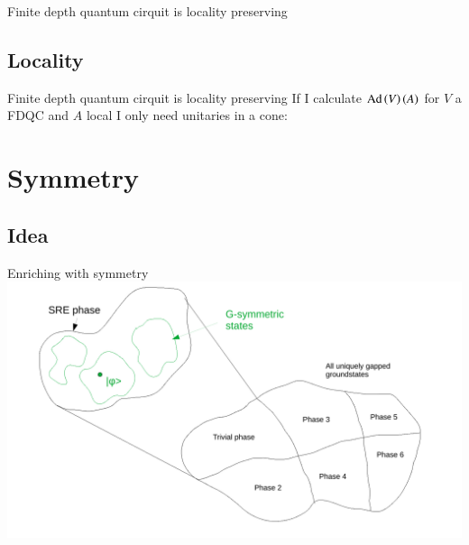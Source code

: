 \documentclass{beamer}
\begin{document}
\begin{frame}{Finite depth quantum cirquit is locality preserving}
	\begin{center}
		\scalebox{0.75}{}
	\end{center}
	\pause
	\begin{center}
		\scalebox{0.75}{}
	\end{center}
\end{frame}

\subsection{Locality}

\begin{frame}{Finite depth quantum cirquit is locality preserving}
	If I calculate $\textrm{Ad}\left(V\right)(A)$ for $V$ a FDQC and $A$ local I only need unitaries in a cone:
	\begin{center}
		\scalebox{0.75}{
			
		}
	\end{center}
\end{frame}

\section{Symmetry}
\subsection{Idea}

\begin{frame}{Enriching with symmetry}
	\includegraphics[width=\textwidth]{Figures/G-invariant_Parts_Of_SRE_Phase.pdf}
\end{frame}
\end{document}
